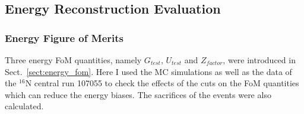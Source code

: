 
\subsection{Energy Reconstruction Evaluation}

\subsubsection{Energy Figure of Merits}\label{sect:energy_fomTest}

Three energy FoM quantities, namely $G_{test}$, $U_{test}$ and $Z_{factor}$, were introduced in Sect.~\ref{sect:energy_fom}. Here I used the MC simulations as well as the data of the $^{16}$N central run 107055 to check the effects of the cuts on the FoM quantities which can reduce the energy biases. The sacrifices of the events were also calculated.


